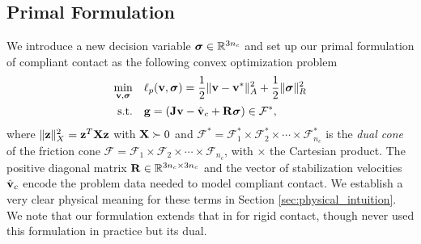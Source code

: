 
\subsection{Primal Formulation}
\label{sec:primal_formulation}

We introduce a new decision variable ${\bm{\sigma}}\in\mathbb{R}^{3n_c}$ and set
up our primal formulation of compliant contact as the following convex
optimization problem
\begin{equation}
	\begin{aligned}
	\min_{\mf{v},\bsigma} \quad & \ell_p(\mf{v},\bsigma) =
	\frac{1}{2}\Vert\mf{v}-\mf{v}^*\Vert_{A}^2 +
	\frac{1}{2} \Vert\bsigma\Vert_{R}^2\\
	\textrm{s.t.} \quad & \mf{g} = (\mf{J}\mf{v}-\hat{\mf{v}}_c + \mf{R}\bsigma) \in \mathcal{F}^*,\\
	\end{aligned}
	\label{eq:primal_regularized}
\end{equation}
where $\Vert{\mathbf{z}}\Vert_X^2={\mathbf{z}}^T{\mathbf{X}}{\mathbf{z}}$ with ${\mathbf{X}}\succ 0$ and
$\mathcal{F^*}= \mathcal{F}^*_1 \times \mathcal{F}^*_2 \times \cdots \times
\mathcal{F}^*_{n_c}$ is the \emph{dual cone} of the friction cone $\mathcal{F} =
\mathcal{F}_1 \times \mathcal{F}_2 \times \cdots \times \mathcal{F}_{n_c}$, with
$\times$ the Cartesian product. The positive diagonal matrix
${\mathbf{R}}\in\mathbb{R}^{3n_c\times 3n_c}$ and the vector of stabilization
velocities $\hat{{\mathbf{v}}}_c$ encode the problem data needed to model compliant
contact. We establish a very clear physical meaning for these terms in Section
\ref{sec:physical_intuition}. We note that our formulation extends that in
\cite{bib:mazhar2014} for rigid contact, though \cite{bib:mazhar2014} never used
this formulation in practice but its dual.

